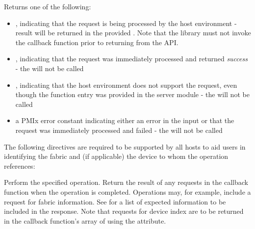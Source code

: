 Returns one of the following:

\begin{itemize}
    \item {}, indicating that the request is being processed by the host environment - result will be returned in the provided . Note that the library must not invoke the callback function prior to returning from the \ac{API}.
    \item {}, indicating that the request was immediately processed and returned \textit{success} - the  will not be called
    \item {}, indicating that the host environment does not support the request, even though the function entry was provided in the server module - the  will not be called
    \item a PMIx error constant indicating either an error in the input or that the request was immediately processed and failed - the  will not be called
\end{itemize}

\reqattrstart
The following directives are required to be supported by all hosts to aid users in identifying the fabric and (if applicable) the device to whom the operation references:


\reqattrend

\descr

Perform the specified operation. Return the result of any requests in the callback function when the operation is completed. Operations may, for example, include a request for fabric information. See  for a list of expected information to be included in the response. Note that requests for device index are to be returned in the callback function's array of  using the  attribute.

